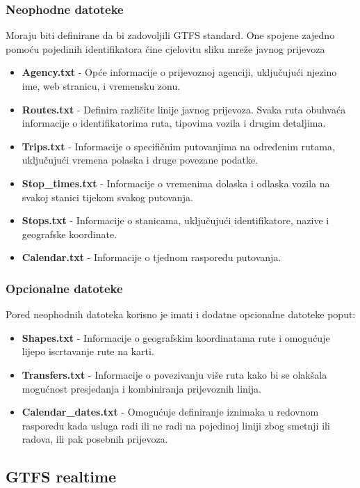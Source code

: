 \documentclass[zavrsnirad]{fer}
\begin{document}
\newpage

\subsubsection{Neophodne datoteke}
Moraju biti definirane da bi zadovoljili GTFS standard. One spojene zajedno pomoću pojedinih identifikatora čine cjelovitu sliku mreže javnog prijevoza
\begin{itemize}
	\item \textbf{Agency.txt} -
	Opće informacije o prijevoznoj agenciji, uključujući njezino ime, web stranicu, i vremensku zonu.
	\item \textbf{Routes.txt} -
	Definira različite linije javnog prijevoza. Svaka ruta obuhvaća informacije o identifikatorima ruta, tipovima vozila i drugim detaljima.
	\item \textbf{Trips.txt} -
	Informacije o specifičnim putovanjima na određenim rutama, uključujući vremena polaska i druge povezane podatke.
	\item \textbf{Stop\_times.txt} -
	Informacije o vremenima dolaska i odlaska vozila na svakoj stanici tijekom svakog putovanja.
	\item \textbf{Stops.txt} -
	Informacije o stanicama, uključujući identifikatore, nazive i geografske koordinate.
	\item \textbf{Calendar.txt} -
	Informacije o tjednom rasporedu putovanja.
\end{itemize}

\subsubsection{Opcionalne datoteke}
Pored neophodnih datoteka korisno je imati i dodatne opcionalne datoteke poput:
\begin{itemize}
	\item \textbf{Shapes.txt} -
	Informacije o geografskim koordinatama rute i omogućuje lijepo iscrtavanje rute na karti.
	\item \textbf{Transfers.txt} -
	Informacije o povezivanju više ruta kako bi se olakšala mogućnost presjedanja i kombiniranja prijevoznih linija.
	\item \textbf{Calendar\_dates.txt} -
	Omogućuje definiranje iznimaka u redovnom rasporedu kada usluga radi ili ne radi na pojedinoj liniji zbog smetnji ili radova, ili pak posebnih prijevoza.
\end{itemize}

\subsection[GTFS-rt]{GTFS realtime}
\end{document}
